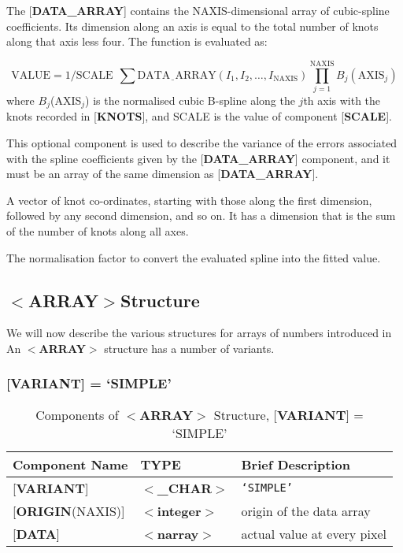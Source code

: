 \documentclass[twoside,11pt,nolof,noabs]{starlink}
\begin{document}
\begin{description}

\item The {[}\textbf{DATA\_ARRAY}{]} contains the NAXIS-dimensional array of
cubic-spline coefficients.  Its dimension along an axis is equal to
the total number of knots along that axis less four.  The function
is evaluated as:

$$\mathrm{VALUE}=1/\mathrm{SCALE}~~\sum \mathrm{DATA\underline{~~}ARRAY}(I_1,I_2,\ldots,I_{\mathrm{NAXIS}})\prod_{j=1}^{\mathrm{NAXIS}} B_j(\mathrm{AXIS}_j) $$
where $B_j$(AXIS$_j$) is the normalised cubic B-spline along the $j$th
axis with the knots recorded in {[}\textbf{KNOTS}{]}, and SCALE is the value
of component {[}\textbf{SCALE}{]}.

\item [{[}VARIANCE{]}]  This optional component is used to describe the
variance of the errors associated with the spline coefficients
given by the {[}\textbf{DATA\_ARRAY}{]} component, and it must be an
array of the same dimension as {[}\textbf{DATA\_ARRAY}{]}.

\item [{[}KNOTS{]}]  A vector of knot co-ordinates, starting with
those along the first dimension, followed by any second dimension, and
so on.  It has a dimension that is the sum of the number of knots
along all axes.

\item [{[}SCALE{]}] The normalisation factor to convert the evaluated
spline into the fitted value.

\end{description}

\subsection{$<$\textbf{ARRAY}$>$Structure\label{se:sarray}}

We will now describe the various structures for arrays of numbers
introduced in 
An \mbox{$<$\textbf{ARRAY}$>$} structure has a number of variants.

\subsubsection{{[}\textbf{VARIANT}{]} = `SIMPLE'}

\begin{table}
\centering
\caption{Components of $<$\textbf{ARRAY}$>$ Structure,
               {[}\textbf{VARIANT}{]} = `SIMPLE'}
\begin{tabular}{|l|l|l|}
\hline
Component Name  & TYPE & Brief Description \\ \hline
{[}\textbf{VARIANT}{]} & $<$\textbf{\_CHAR}$>$ & \texttt{`SIMPLE'} \\
{[}\textbf{ORIGIN}(NAXIS){]} & $<$\textbf{integer}$>$ & origin of the data array \\
{[}\textbf{DATA}{]} & $<$\textbf{narray}$>$ & actual value at every pixel \\ \hline
\end{tabular}
\end{table}
\end{document}
